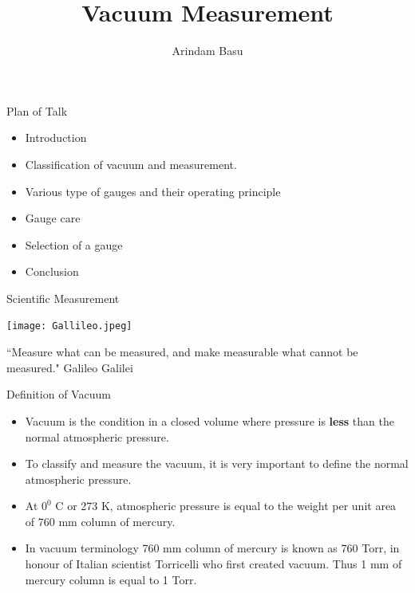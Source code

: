 \documentclass[11pt]{beamer}
\author{Arindam Basu}
\title{Vacuum Measurement}
\institute{IADD, BARC}
\begin{document}
\begin{frame}
\titlepage
\end{frame}





\begin{frame}{Plan of Talk}

\begin{block}

	\begin{itemize}
		\item Introduction
		\item  Classification of vacuum and measurement.
		\item  Various type of gauges and their operating principle
		\item  Gauge care
		\item  Selection of a gauge
		\item Conclusion
	\end{itemize}

\end{block}



\end{frame}


\begin{frame}{Scientific Measurement}

     \begin{center}
		\texttt{[image: Gallileo.jpeg]}
		\end{center}
     
     ``Measure what can be measured, and make measurable what cannot be measured."  Galileo Galilei

\end{frame}




\begin{frame}{Definition of Vacuum}

\begin{block}

	\begin{itemize}
		\item  Vacuum is the condition in a closed volume where pressure is \textbf{less} than the normal atmospheric pressure. 
		\item  To classify and measure the vacuum, it is very important to define the normal atmospheric pressure.
		\item  At  $0^{0}$  C or 273 K, atmospheric pressure is equal to the weight per unit area of  760 mm column of mercury.
		\item  In vacuum terminology 760 mm column of mercury is known as \alert{760 Torr}, in honour of Italian scientist Torricelli who first created vacuum. Thus 1 mm  of mercury column is equal to 1 Torr.
		
	\end{itemize}

\end{block}



\end{frame}
\end{document}
